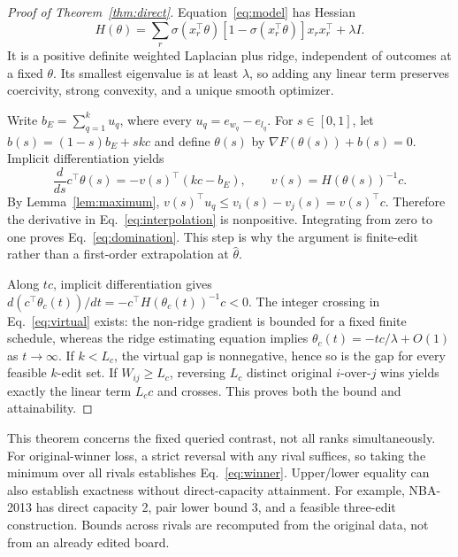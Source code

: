 \documentclass{article}
\begin{document}
\begin{proof}[Proof of Theorem~\ref{thm:direct}]
Equation~\eqref{eq:model} has Hessian
\begin{equation}
 H(\theta)=\sum_r\sigma(x_r^\top\theta)[1-\sigma(x_r^\top\theta)]x_rx_r^\top+\lambda I.\label{eq:hessian}
\end{equation}
It is a positive definite weighted Laplacian plus ridge, independent of outcomes at a fixed $\theta$. Its smallest eigenvalue is at least $\lambda$, so adding any linear term preserves coercivity, strong convexity, and a unique smooth optimizer.

Write $b_E=\sum_{q=1}^k u_q$, where every $u_q=e_{w_q}-e_{l_q}$. For $s\in[0,1]$, let $b(s)=(1-s)b_E+s k c$ and define $\theta(s)$ by $\nabla F(\theta(s))+b(s)=0$. Implicit differentiation yields
\begin{equation}
 \frac{d}{ds}c^\top\theta(s)
  =-v(s)^\top(kc-b_E),\qquad v(s)=H(\theta(s))^{-1}c.\label{eq:interpolation}
\end{equation}
By Lemma~\ref{lem:maximum}, $v(s)^\top u_q\le v_i(s)-v_j(s)=v(s)^\top c$. Therefore the derivative in Eq.~\eqref{eq:interpolation} is nonpositive. Integrating from zero to one proves Eq.~\eqref{eq:domination}. This step is why the argument is finite-edit rather than a first-order extrapolation at $\hat\theta$.

Along $tc$, implicit differentiation gives $d(c^\top\theta_c(t))/dt=-c^\top H(\theta_c(t))^{-1}c<0$. The integer crossing in Eq.~\eqref{eq:virtual} exists: the non-ridge gradient is bounded for a fixed finite schedule, whereas the ridge estimating equation implies $\theta_c(t)=-tc/\lambda+O(1)$ as $t\to\infty$. If $k<L_c$, the virtual gap is nonnegative, hence so is the gap for every feasible $k$-edit set. If $W_{ij}\ge L_c$, reversing $L_c$ distinct original $i$-over-$j$ wins yields exactly the linear term $L_c c$ and crosses. This proves both the bound and attainability.
\end{proof}

This theorem concerns the fixed queried contrast, not all ranks simultaneously. For original-winner loss, a strict reversal with any rival suffices, so taking the minimum over all rivals establishes Eq.~\eqref{eq:winner}. Upper/lower equality can also establish exactness without direct-capacity attainment. For example, NBA-2013 has direct capacity 2, pair lower bound 3, and a feasible three-edit construction. Bounds across rivals are recomputed from the original data, not from an already edited board.
\end{document}
